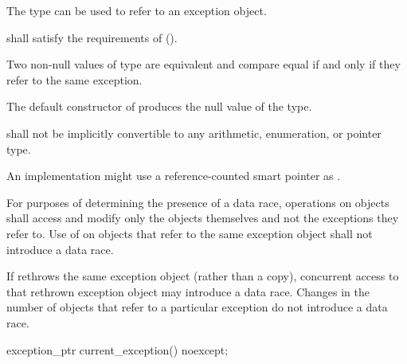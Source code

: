 \begin{itemdescr}
\pnum
The type  can be used to refer to an exception object.

\pnum
{} shall satisfy the requirements of
 ().

\pnum
Two non-null values of type  are equivalent and compare equal if and
only if they refer to the same exception.

\pnum
The default constructor of  produces the null value of the
type.

\pnum
{} shall not be implicitly convertible to any arithmetic,
enumeration, or pointer type.

\pnum
\begin{note} An implementation might use a reference-counted smart
pointer as . \end{note}

\pnum
For purposes of determining the presence of a data race, operations on
 objects shall access and modify only the
 objects themselves and not the exceptions they refer to.
Use of  on  objects that refer to
the same exception object shall not introduce a data race. \begin{note} If
 rethrows the same exception object (rather than a copy),
concurrent access to that rethrown exception object may introduce a data race.
Changes in the number of  objects that refer to a
particular exception do not introduce a data race. \end{note}
\end{itemdescr}

%
\begin{itemdecl}
exception_ptr current_exception() noexcept;
\end{itemdecl}

